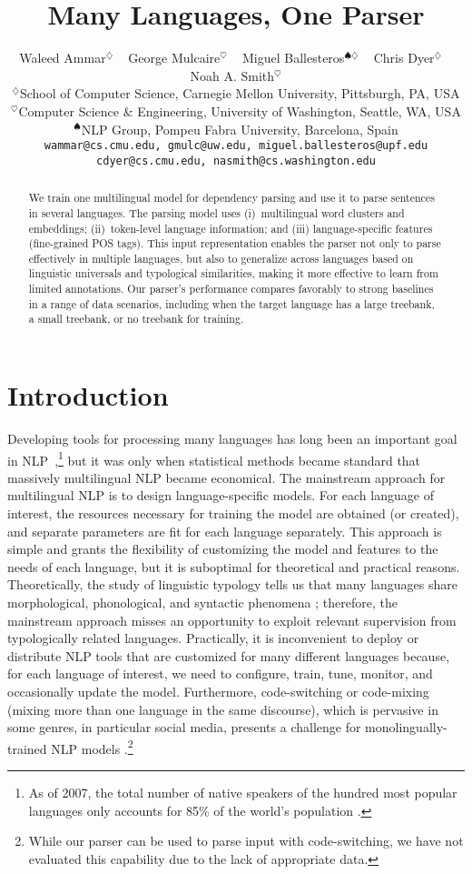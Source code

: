 \documentclass[11pt]{article}
\title{Many Languages, One Parser}
\author{Waleed Ammar$^{\diamondsuit}$ ~ George Mulcaire$^{\heartsuit}$ ~ Miguel Ballesteros$^{\spadesuit\diamondsuit}$ ~ Chris Dyer$^{\diamondsuit}$ ~ Noah A. Smith$^{\heartsuit}$\\
$^\diamondsuit$School of Computer Science, Carnegie Mellon University, Pittsburgh, PA, USA \\
$^{\heartsuit}$Computer Science \& Engineering, University of Washington, Seattle, WA, USA\\
$^\spadesuit$NLP Group, Pompeu Fabra University, Barcelona, Spain \\
{\tt wammar@cs.cmu.edu, gmulc@uw.edu, miguel.ballesteros@upf.edu} \\ {\tt cdyer@cs.cmu.edu, nasmith@cs.washington.edu}
}
\date{}
\begin{document}
\maketitle
\begin{abstract}
We train one multilingual model for dependency parsing and use it to parse sentences in several languages.
The parsing model uses (i)~multilingual word clusters and embeddings; (ii)~token-level language information; and (iii) language-specific features (fine-grained POS tags). This input representation enables the parser not only to parse effectively in multiple languages, but also to generalize across languages based on linguistic universals and typological similarities, making it more effective to learn from limited annotations.
Our parser's performance compares favorably to strong baselines in a range of data scenarios, including when the target language has a large treebank, a small treebank, or no treebank for training.
\end{abstract}

\section{Introduction}
\label{sec:introduction}

Developing tools for processing many languages has long been an important goal in NLP~\cite{rosner:88,heid:89},\footnote{As of 2007, the total number of native speakers of the hundred most popular languages only accounts for 85\% of the world's population \cite{native:07}.}
but it was only when statistical methods became standard that massively multilingual NLP became economical.
The mainstream approach for multilingual NLP is to design language-specific  models.
For each language of interest, the resources necessary for training the model are obtained (or created), and separate parameters are fit for each language separately.
This approach is simple and grants the flexibility of customizing the model and features to the needs of each language, but it is suboptimal for theoretical and practical reasons.
Theoretically, the study of linguistic typology tells us that many languages share morphological, phonological, and syntactic phenomena \cite{bender:11}; therefore, the mainstream approach misses an opportunity to exploit relevant supervision from typologically related languages.
Practically, it is inconvenient to deploy or distribute NLP tools that are customized for many different languages because, for each language of interest, we need to configure, train, tune, monitor, and occasionally update the model.
Furthermore, code-switching or code-mixing (mixing more than one language in the same discourse), which is pervasive in some genres, in particular social media, presents a challenge for monolingually-trained NLP models \cite{barman:14}.\footnote{While our parser can be used to parse input with code-switching, we have not evaluated this capability due to the lack of appropriate data.}
\end{document}
